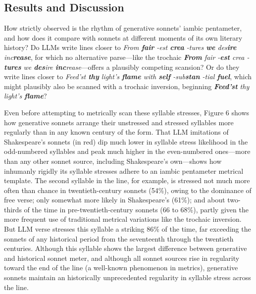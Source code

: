 \documentclass{simple-humanities}         %
\begin{document}
\subsection{Results and Discussion}

How strictly observed is the rhythm of generative sonnets' iambic pentameter, and how does it compare with sonnets at different moments of its own literary history? Do LLMs write lines closer to \emph{From \textbf{fair} \textbar{} -est \textbf{crea} \textbar{} -tures \textbf{we} \textbar{} des\textbf{ire} \textbar{} inc\textbf{rease}}, for which no alternative parse---like the trochaic \emph{\textbf{From} fair \textbar{} -\textbf{est} crea \textbar{} -\textbf{tures} we \textbar{} \textbf{des}ire \textbar{} \textbf{inc}rease}---offers a plausibly competing scansion? Or do they write lines closer to \emph{Feed'st \textbf{thy} \textbar{} light's \textbf{flame} \textbar{} with \textbf{self} \textbar{} -sub\textbf{stan} \textbar{} -tial \textbf{fuel}}, which might plausibly also be scanned with a trochaic inversion, beginning \emph{\textbf{Feed'st} thy \textbar{} light's \textbf{flame}}?

Even before attempting to metrically scan these syllable stresses, Figure 6 shows how generative sonnets arrange their unstressed and stressed syllables more regularly than in any known century of the form.
That LLM imitations of Shakespeare's sonnets (in red) dip much lower in syllable stress likelihood in the odd-numbered syllables and peak much higher in the even-numbered ones---more than any other sonnet source, including Shakespeare's own---shows how inhumanly rigidly its syllable stresses adhere to an iambic pentameter metrical template.
The second syllable in the line, for example, is stressed not much more often than chance in twentieth-century sonnets (54\%), owing to the dominance of free verse; only somewhat more likely in Shakespeare's (61\%); and about two-thirds of the time in pre-twentieth-century sonnets (66 to 68\%), partly given the more frequent use of traditional metrical variations like the trochaic inversion. 
But LLM verse stresses this syllable a striking 86\% of the time, far exceeding the sonnets of any historical period from the seventeenth through the twentieth centuries. 
Although this syllable shows the largest difference between generative and historical sonnet meter, and although all sonnet sources rise in regularity toward the end of the line (a well-known phenomenon in metrics), generative sonnets maintain an historically unprecedented regularity in syllable stress across the line.
\end{document}
